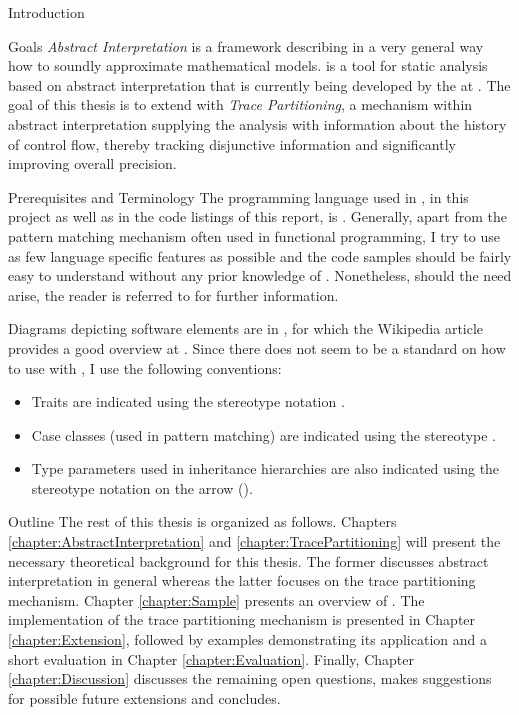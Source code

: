 \begin{chapter}{Introduction}
	\begin{section}{Goals}
		\emph{Abstract Interpretation} is a framework describing in a very general way how to soundly approximate mathematical models. \sample is a tool for static analysis based on abstract interpretation that is currently being developed by the \copm at \ethz. The goal of this thesis is to extend \sample with \emph{Trace Partitioning}, a mechanism within abstract interpretation supplying the analysis with information about the history of control flow, thereby tracking disjunctive information and significantly improving overall precision.
	\end{section}

	\begin{section}{Prerequisites and Terminology}
		The programming language used in \sample, in this project as well as in the code listings of this report, is \scala. Generally, apart from the pattern matching mechanism often used in functional programming, I try to use as few language specific features as possible and the code samples should be fairly easy to understand without any prior knowledge of \scala. Nonetheless, should the need arise, the reader is referred to \cite{wiki:scala} for further information.

		Diagrams depicting software elements are in \uml, for which the Wikipedia article provides a good overview at \cite{wiki:uml}. Since there does not seem to be a standard on how to use \uml with \scala, I use the following conventions:

		\begin{itemize}
			\item Traits are indicated using the stereotype notation .
			\item Case classes (used in pattern matching) are indicated using the stereotype .
			\item Type parameters used in inheritance hierarchies are also indicated using the stereotype notation on the arrow ().
		\end{itemize}
	\end{section}

	\begin{section}{Outline}
		The rest of this thesis is organized as follows. Chapters \ref{chapter:AbstractInterpretation} and \ref{chapter:TracePartitioning} will present the necessary theoretical background for this thesis. The former discusses abstract interpretation in general whereas the latter focuses on the trace partitioning mechanism. Chapter \ref{chapter:Sample} presents an overview of \sample. The implementation of the trace partitioning mechanism is presented in Chapter \ref{chapter:Extension}, followed by examples demonstrating its application and a short evaluation in Chapter \ref{chapter:Evaluation}. Finally, Chapter \ref{chapter:Discussion} discusses the remaining open questions, makes suggestions for possible future extensions and concludes.
	\end{section}

\end{chapter}
